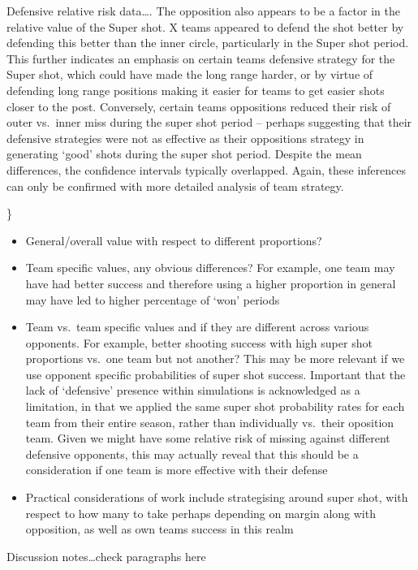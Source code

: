 \documentclass[]{elsarticle} %
\providecommand{\tightlist}{%
  \setlength{\itemsep}{0pt}\setlength{\parskip}{0pt}}
\begin{document}
Defensive relative risk data\ldots. The opposition also appears to be a
factor in the relative value of the Super shot. X teams appeared to
defend the shot better by defending this better than the inner circle,
particularly in the Super shot period. This further indicates an
emphasis on certain teams defensive strategy for the Super shot, which
could have made the long range harder, or by virtue of defending long
range positions making it easier for teams to get easier shots closer to
the post. Conversely, certain teams oppositions reduced their risk of
outer vs.~inner miss during the super shot period -- perhaps suggesting
that their defensive strategies were not as effective as their
oppositions strategy in generating `good' shots during the super shot
period. Despite the mean differences, the confidence intervals typically
overlapped. Again, these inferences can only be confirmed with more
detailed analysis of team strategy.

\}

\begin{itemize}
\tightlist
\item
  General/overall value with respect to different proportions?
\item
  Team specific values, any obvious differences? For example, one team
  may have had better success and therefore using a higher proportion in
  general may have led to higher percentage of `won' periods
\item
  Team vs.~team specific values and if they are different across various
  opponents. For example, better shooting success with high super shot
  proportions vs.~one team but not another? This may be more relevant if
  we use opponent specific probabilities of super shot success.
  Important that the lack of `defensive' presence within simulations is
  acknowledged as a limitation, in that we applied the same super shot
  probability rates for each team from their entire season, rather than
  individually vs.~their oposition team. Given we might have some
  relative risk of missing against different defensive opponents, this
  may actually reveal that this should be a consideration if one team is
  more effective with their defense
\item
  Practical considerations of work include strategising around super
  shot, with respect to how many to take perhaps depending on margin
  along with opposition, as well as own teams success in this realm
\end{itemize}

Discussion notes\ldots check paragraphs here
\end{document}

